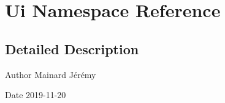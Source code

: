 \hypertarget{namespace_ui}{}\section{Ui Namespace Reference}
\label{namespace_ui}


\subsection{Detailed Description}
\begin{DoxyAuthor}{Author}
Mainard Jérémy 
\end{DoxyAuthor}
\begin{DoxyDate}{Date}
2019-\/11-\/20 
\end{DoxyDate}
